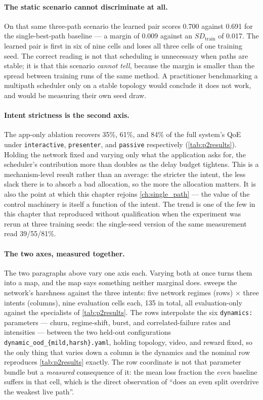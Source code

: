 \paragraph{The static scenario cannot discriminate at all.} On that same three-path scenario the
learned pair scores 0.700 against 0.691 for the single-best-path baseline --- a margin of 0.009 against
an $\mathit{SD}_{\mathrm{train}}$ of 0.017. The learned pair is first in six of nine cells and loses all
three cells of one training seed. The correct reading is not that scheduling is unnecessary when paths
are stable; it is that this scenario \emph{cannot tell}, because the margin is smaller than the spread
between training runs of the same method. A practitioner benchmarking a multipath scheduler only on a
stable topology would conclude it does not work, and would be measuring their own seed draw.

\paragraph{Intent strictness is the second axis.} The app-only ablation recovers 35\%, 61\%, and 84\%
of the full system's QoE under \texttt{interactive}, \texttt{presenter}, and \texttt{passive}
respectively (\cref{tab:p2results}). Holding the network fixed and varying only what the application
asks for, the scheduler's contribution more than doubles as the delay budget tightens. This is a
mechanism-level result rather than an average: the stricter the intent, the less slack there is to
absorb a bad allocation, so the more the allocation matters. It is also the point at which this chapter
rejoins \cref{ch:single_path} --- the value of the control machinery is itself a function of the intent.
The trend is one of the few in this chapter that reproduced without qualification when the experiment
was rerun at three training seeds: the single-seed version of the same measurement read 39/55/81\%.

\paragraph{The two axes, measured together.} The two paragraphs above vary one axis each. Varying both
at once turns them into a map, and the map says something neither marginal does.
 sweeps the network's harshness against the three intents: five network
regimes (rows) $\times$ three intents (columns), nine evaluation cells each, 135 in total, all
evaluation-only against the specialists of \cref{tab:p2results}. The rows interpolate the six
\texttt{dynamics:} parameters --- churn, regime-shift, burst, and correlated-failure rates and
intensities --- between the two held-out configurations \texttt{dynamic\_ood\_\{mild,harsh\}.yaml},
holding topology, video, and reward fixed, so the only thing that varies down a column is the dynamics
and the nominal row reproduces \cref{tab:p2results} exactly. The row coordinate is not that parameter
bundle but a \emph{measured} consequence of it: the mean loss fraction the \emph{even} baseline suffers
in that cell, which is the direct observation of ``does an even split overdrive the weakest live path''.

